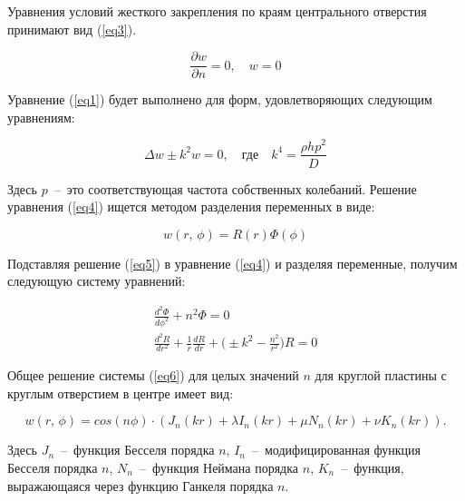 \documentclass[12pt, a4paper]{article}
\begin{document}
    Уравнения условий жесткого закрепления по краям центрального отверстия принимают вид (\ref{eq3}).
    
    \begin{equation}
         \frac{\partial w}{\partial n} = 0, \quad w = 0
         \label{eq3}
    \end{equation}
    
    Уравнение (\ref{eq1}) будет выполнено для форм, удовлетворяющих следующим уравнениям:
    
    \begin{equation}
        \Delta w \pm k^{2}w = 0, \quad \text{где} \quad k^{4} = \frac{\rho h p^{2}}{D}
        \label{eq4}
    \end{equation}
    
    Здесь $p$~--~это соответствующая частота собственных колебаний. Решение уравнения (\ref{eq4}) ищется методом разделения переменных в виде:
    
    \begin{equation}
        w(r, \, \phi) = R(r)\Phi(\phi)
        \label{eq5}
    \end{equation}
    
    Подставляя решение (\ref{eq5}) в уравнение (\ref{eq4}) и разделяя переменные, получим следующую систему уравнений:
    
    \begin{equation}
        \begin{aligned}
            \frac{d^{2} \Phi}{d \phi^{2}} + n^{2} \Phi = 0 \\
            \frac{d^{2}R}{d r^{2}} + \frac{1}{r} \frac{d R}{d r} + \Big( \pm k^{2} - \frac{n^{2}}{r^{2}} \Big) R = 0
        \end{aligned}
        \label{eq6}
    \end{equation}
    
    Общее решение системы (\ref{eq6}) для целых значений $n$ для круглой пластины с круглым отверстием в центре имеет вид:
    
    \begin{equation}
        w(r, \, \phi) = cos(n \phi) \cdot (J_{n}(kr) + \lambda I_{n}(kr) + \mu N_{n}(kr) + \nu K_{n}(kr)).
        \label{eq7}
    \end{equation}
    
    Здесь $J_{n}$~--~функция Бесселя порядка $n$, $I_{n}$~--~модифицированная функция Бесселя порядка $n$, $N_{n}$~--~функция Неймана порядка $n$, $K_{n}$~--~функция, выражающаяся через функцию Ганкеля порядка $n$.
     
\end{document}
